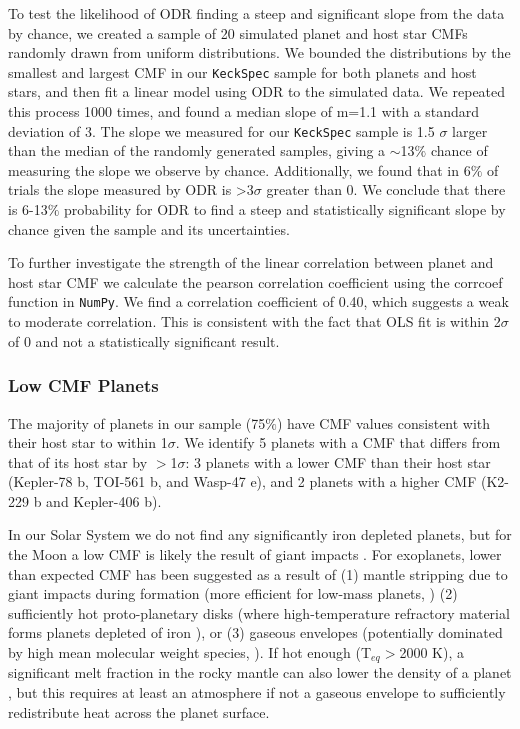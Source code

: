 \documentclass[twocolumn]{aastex631}
\begin{document}
To test the likelihood of ODR finding a steep and significant slope from the data by chance, we created a sample of 20 simulated planet and host star CMFs randomly drawn from uniform distributions. We bounded the distributions by the smallest and largest CMF in our \texttt{KeckSpec} sample for both planets and host stars, and then fit a linear model using ODR to the simulated data. We repeated this process 1000 times, and found a median slope of m=1.1 with a standard deviation of 3. The slope we measured for our \texttt{KeckSpec} sample is 1.5 $\sigma$ larger than the median of the randomly generated samples, giving a $\sim$13$\%$ chance of measuring the slope we observe by chance.
Additionally, we found that in 6$\%$ of trials the slope measured by ODR is >3$\sigma$ greater than 0. We conclude that there is 6-13$\%$ probability for ODR to find a steep and statistically significant slope by chance given the sample and its uncertainties. %

To further investigate the strength of the linear correlation between planet and host star CMF we calculate the pearson correlation coefficient using the corrcoef function in \texttt{NumPy}. We find a correlation coefficient of 0.40, which suggests a weak to moderate correlation. This is consistent with the fact that OLS fit is within 2$\sigma$ of 0 and not a statistically significant result. 


\subsubsection{Low CMF Planets}

The majority of planets in our sample (75$\%$) have CMF values consistent with their host star to within 1$\sigma$. We identify 5 planets with a CMF that differs from that of its host star by $>$1$\sigma$: 3 planets with a lower CMF than their host star (Kepler-78 b, TOI-561 b, and Wasp-47 e), and 2 planets with a higher CMF (K2-229 b and Kepler-406 b). 

In our Solar System we do not find any significantly iron depleted planets, but for the Moon a low CMF is likely the result of giant impacts \citep{1976LPI.....7..120C, 2014AREPS..42..551A}. For exoplanets, lower than expected CMF has been suggested as a result of (1) mantle stripping due to giant impacts during formation (more efficient for low-mass planets, \citealt{2020MNRAS.493.4910S, 2022ApJ...940..144S}) (2) sufficiently hot proto-planetary disks (where high-temperature refractory material forms planets depleted of iron \citealt{Dorn2019}), or (3) gaseous envelopes (potentially dominated by high mean molecular weight species, \citealt{2017AJ....154..232A, 2021ApJ...909L..22K}). If hot enough (T$_{eq}>$2000 K), a significant melt fraction in the rocky mantle can also lower the density of a planet \citep{Bower2019}, but this requires at least an atmosphere if not a gaseous envelope to sufficiently redistribute heat across the planet surface. 
\end{document}

